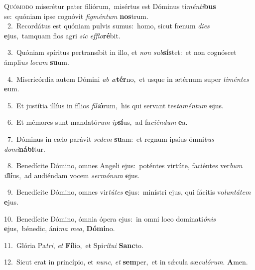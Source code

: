 \lettrine{\initial\textcolor{\initialcolor}{Q}}{uómodo} miserétur pater filiórum,~\dagger misértus est Dóminus ti\-\textit{mén}\-\textit{ti}\textbf{bus} se:~\star quóniam ipse cognóvit \textit{fig}\-\textit{mén}\textit{tum} \textbf{nos}\-trum.\\
{\numbfont\textcolor{\numbcolor}{~2.}}~Recordátus est quóniam pulvis sumus:~\dagger homo, sicut fœnum \textit{di}\-\textit{es} \textbf{e}\-jus,~\star tamquam flos agri \textit{sic} \textit{ef}\-\textit{flo}\textbf{ré}bit.\par
{\numbfont\textcolor{\numbcolor}{~3.}}~Quóniam spíritus pertransíbit in illo, et \textit{non} \textit{sub}\-\textbf{sís}tet:~\star et non cognóscet ámpli\textit{us} \textit{lo}\-\textit{cum} \textbf{su}\-um.\par
{\numbfont\textcolor{\numbcolor}{~4.}}~Misericórdia autem Dómini \textit{ab} \textit{æ}\-\textbf{tér}no,~\star et usque in ætérnum super \textit{ti}\-\textit{mén}\textit{tes} \textbf{e}\-um.\par
{\numbfont\textcolor{\numbcolor}{~5.}}~Et justítia illíus in fílios \textit{fi}\-\textit{li}\textbf{ó}rum,~\star his qui servant tes\-\textit{ta}\-\textit{mén}\textit{tum} \textbf{e}\-jus.\par
{\numbfont\textcolor{\numbcolor}{~6.}}~Et mémores sunt mandató\textit{rum} \textit{ip}\-\textbf{sí}us,~\star ad fa\-\textit{ci}\-\textit{én}\textit{dum} \textbf{e}\-a.\par
{\numbfont\textcolor{\numbcolor}{~7.}}~Dóminus in cælo parávit \textit{se}\-\textit{dem} \textbf{su}\-am:~\star et regnum ipsíus ómni\textit{bus} \textit{do}\-\textit{mi}\textbf{ná}\textbf{bi}tur.\par
{\numbfont\textcolor{\numbcolor}{~8.}}~Benedícite Dómino, omnes Angeli ejus:~\dagger poténtes virtúte, faciéntes ver\textit{bum} \textit{il}\-\textbf{lí}us,~\star ad audiéndam vocem \textit{ser}\-\textit{mó}\textit{num} \textbf{e}\-jus.\par
{\numbfont\textcolor{\numbcolor}{~9.}}~Benedícite Dómino, omnes vir\-\textit{tú}\-\textit{tes} \textbf{e}\-jus:~\star minístri ejus, qui fácitis vo\-\textit{lun}\-\textit{tá}\textit{tem} \textbf{e}\-jus.\par
{\numbfont\textcolor{\numbcolor}{10.}}~Benedícite Dómino, ómnia ópera ejus:~\dagger in omni loco dominati\-\textit{ó}\-\textit{nis} \textbf{e}\-jus,~\star bénedic, áni\textit{ma} \textit{me}\-\textit{a}, \textbf{Dó}\-\textbf{mi}no.\par
{\numbfont\textcolor{\numbcolor}{11.}}~Glória Pa\-\textit{tri}\-, \textit{et} \textbf{Fí}\-lio,~\star et Spi\-\textit{rí}\-\textit{tu}\textit{i} \textbf{Sanc}\-to.\par
{\numbfont\textcolor{\numbcolor}{12.}}~Sicut erat in princípio, et \textit{nunc}\-, \textit{et} \textbf{sem}\-per,~\star et in sǽcula sæ\-\textit{cu}\-\textit{ló}\textit{rum}. \textbf{A}\-men.\par
